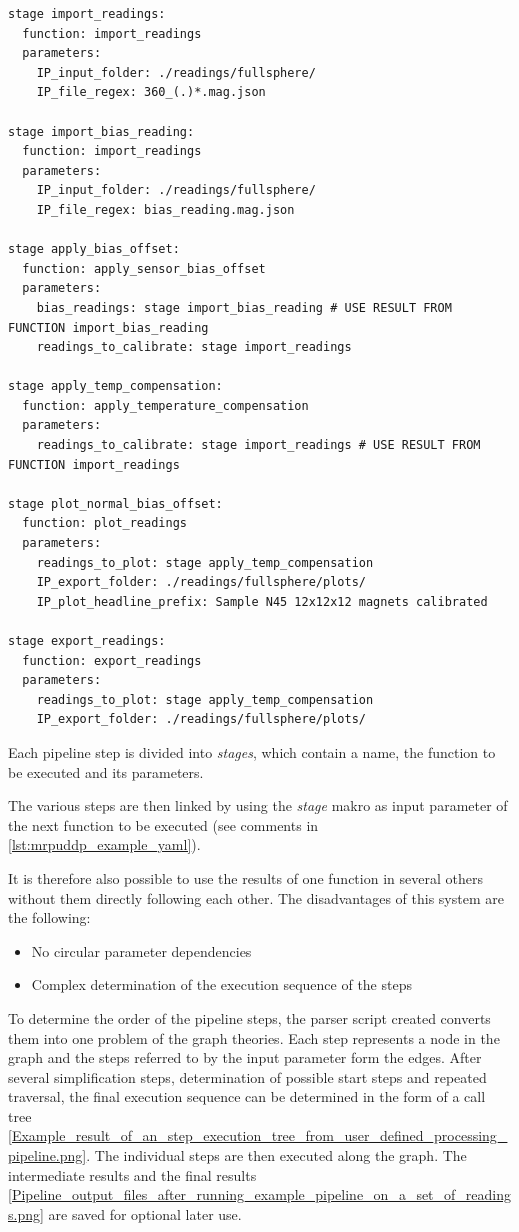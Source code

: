 \begin{lstlisting}[caption={Example YAML code of an user defined processing pipeline with six stages linked together}, label=lst:mrpuddp_example_yaml]
stage import_readings:
  function: import_readings
  parameters:
    IP_input_folder: ./readings/fullsphere/
    IP_file_regex: 360_(.)*.mag.json

stage import_bias_reading:
  function: import_readings
  parameters:
    IP_input_folder: ./readings/fullsphere/
    IP_file_regex: bias_reading.mag.json

stage apply_bias_offset:
  function: apply_sensor_bias_offset
  parameters:
    bias_readings: stage import_bias_reading # USE RESULT FROM FUNCTION import_bias_reading
    readings_to_calibrate: stage import_readings

stage apply_temp_compensation:
  function: apply_temperature_compensation
  parameters:
    readings_to_calibrate: stage import_readings # USE RESULT FROM FUNCTION import_readings

stage plot_normal_bias_offset:
  function: plot_readings
  parameters:
    readings_to_plot: stage apply_temp_compensation
    IP_export_folder: ./readings/fullsphere/plots/
    IP_plot_headline_prefix: Sample N45 12x12x12 magnets calibrated

stage export_readings:
  function: export_readings
  parameters:
    readings_to_plot: stage apply_temp_compensation
    IP_export_folder: ./readings/fullsphere/plots/
\end{lstlisting}

Each pipeline step is divided into \emph{stages}, which contain a name,
the function to be executed and its parameters.

\newpage

The various steps are then linked by using the \emph{stage } makro as
input parameter of the next function to be executed (see comments in
\ref{lst:mrpuddp_example_yaml}).

It is therefore also possible to use the results of one function in
several others without them directly following each other. The
disadvantages of this system are the following:

\begin{itemize}
\tightlist
\item
  No circular parameter dependencies
\item
  Complex determination of the execution sequence of the steps
\end{itemize}

To determine the order of the pipeline steps, the parser script created
converts them into one problem of the graph theories. Each step
represents a node in the graph and the steps referred to by the input
parameter form the edges. After several simplification steps,
determination of possible start steps and repeated traversal, the final
execution sequence can be determined in the form of a call tree
\ref{Example_result_of_an_step_execution_tree_from_user_defined_processing_pipeline.png}.
The individual steps are then executed along the graph. The intermediate
results and the final results
\ref{Pipeline_output_files_after_running_example_pipeline_on_a_set_of_readings.png}
are saved for optional later use.


